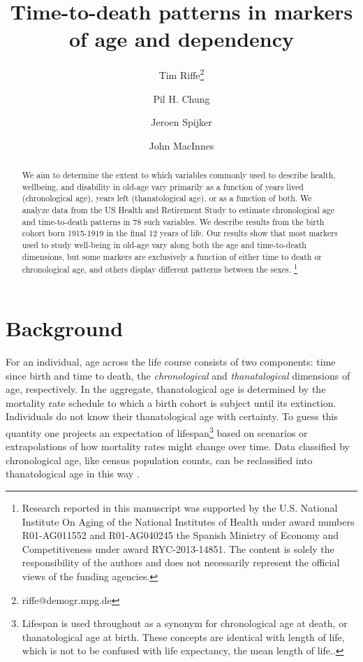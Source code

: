 \documentclass[11pt,oneside]{article} %
\newcommand\ackn[1]{%
  \begingroup
  \renewcommand\thefootnote{}\footnote{#1}%
  \addtocounter{footnote}{-1}%
  \endgroup
}
\begin{document}
\title{Time-to-death patterns in markers of age and dependency}

\author[1]{Tim Riffe\thanks{riffe@demogr.mpg.de}}
\author[2]{Pil H. Chung}
\author[3]{Jeroen Spijker}
\author[4]{John MacInnes}



\maketitle

\begin{abstract}
We aim to determine the extent to which variables commonly
used to describe health, wellbeing, and disability in old-age vary primarily
as a function of years lived (chronological age), years left (thanatological
age), or as a function of both.
We analyze data from the US Health and Retirement Study to estimate chronological age and time-to-death patterns in 78 such variables. We describe
results from the birth cohort born 1915-1919 in the final 12 years of life. Our results show
that most markers used to study well-being in old-age vary along both the age
and time-to-death dimensions, but some markers are exclusively a function of
either time to death or chronological age, and others display different patterns
between the sexes.\ackn{Research reported in this manuscript
was supported by the U.S.
National Institute On Aging of the National Institutes of Health under award
numbers R01-AG011552 and R01-AG040245 the Spanish Ministry of Economy and
Competitiveness under award RYC-2013-14851. The content is solely the
responsibility of the authors and does not necessarily represent the official views of the funding agencies.}
\end{abstract}

\section*{Background}

For an
individual, age across the life course consists of two components: time since
birth and time to death, the \textit{chronological} and \textit{thanatalogical}
dimensions of age, respectively. In the aggregate, thanatological age is determined
by the mortality rate schedule to which a birth cohort is subject until its
extinction. Individuals do not know their thanatological age with certainty. To
guess this quantity one projects an expectation of lifespan\footnote{Lifespan
is used throughout as a synonym for chronological age at death, or
thanatological age at birth. These concepts are identical with length of life,
which is not to be confused with life expectancy, the mean length of life..}
based on scenarios or extrapolations of how mortality rates might change over time. Data classified by chronological age, like census population counts, can be reclassified into thanatological age in this way \citep{brouard1986structure}.
\end{document}
